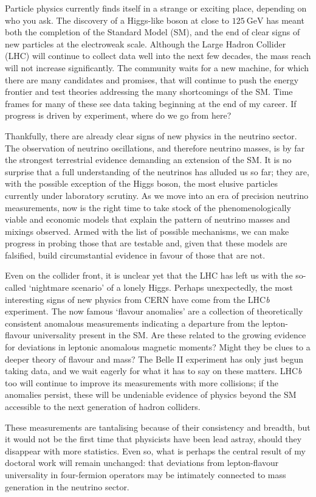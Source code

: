 \begin{preface}
  Particle physics currently finds itself in a strange or exciting place,
  depending on who you ask. The discovery of a Higgs-like boson at close to
  $\SI{125}{\GeV}$ has meant both the completion of the Standard Model (SM), and
  the end of clear signs of new particles at the electroweak scale. Although the
  Large Hadron Collider (LHC) will continue to collect data well into the next
  few decades, the mass reach will not increase significantly. The community
  waits for a new machine, for which there are many candidates and promises,
  that will continue to push the energy frontier and test theories addressing
  the many shortcomings of the SM. Time frames for many of these see data taking
  beginning at the end of my career. If progress is driven by experiment, where
  do we go from here?

  Thankfully, there are already clear signs of new physics in the neutrino
  sector. The observation of neutrino oscillations, and therefore neutrino
  masses, is by far the strongest terrestrial evidence demanding an extension of
  the SM. It is no surprise that a full understanding of the neutrinos has
  alluded us so far; they are, with the possible exception of the Higgs boson,
  the most elusive particles currently under laboratory scrutiny. As we move
  into an era of precision neutrino measurements, now is the right time to take
  stock of the phenomenologically viable and economic models that explain the
  pattern of neutrino masses and mixings observed. Armed with the list of
  possible mechanisms, we can make progress in probing those that are testable
  and, given that these models are falsified, build circumstantial evidence in
  favour of those that are not.

  Even on the collider front, it is unclear yet that the LHC has left us with
  the so-called `nightmare scenario' of a lonely Higgs. Perhaps unexpectedly,
  the most interesting signs of new physics from CERN have come from the
  LHC\textit{b} experiment. The now famous `flavour anomalies' are a collection
  of theoretically consistent anomalous measurements indicating a departure from
  the lepton-flavour universality present in the SM. Are these related to the
  growing evidence for deviations in leptonic anomalous magnetic moments? Might
  they be clues to a deeper theory of flavour and mass? The Belle II experiment
  has only just begun taking data, and we wait eagerly for what it has to say on
  these matters. LHC\textit{b} too will continue to improve its measurements
  with more collisions; if the anomalies persist, these will be undeniable
  evidence of physics beyond the SM accessible to the next generation of hadron
  colliders.

  These measurements are tantalising because of their consistency and breadth,
  but it would not be the first time that physicists have been lead astray,
  should they disappear with more statistics. Even so, what is perhaps the
  central result of my doctoral work will remain unchanged: that deviations from
  lepton-flavour universality in four-fermion operators may be intimately
  connected to mass generation in the neutrino sector.

\end{preface}
